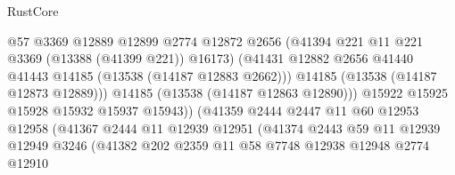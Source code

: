 \begin{lexlean}{RustCore}
\begin{coremodule}
                                          @57
                                          @3369
                                          @12889
                                          @12899
                                          @2774
                                          @12872
                                          @2656
                                          (@41394 @221 @11 @221 @3369 (@13388 (@41399 @221)) @16173)
                                          (@41431
                                            @12882
                                            @2656
                                            @41440
                                            @41443
                                            @14185
                                            (@13538 (@14187 @12883 @2662)))
                                          @14185
                                          (@13538 (@14187 @12873 @12889)))
                                        @14185
                                        (@13538 (@14187 @12863 @12890)))
                                      @15922
                                      @15925
                                      @15928
                                      @15932
                                      @15937
                                      @15943))
                                  (@41359
                                    @2444
                                    @2447
                                    @11
                                    @60
                                    @12953
                                    @12958
                                    (@41367
                                      @2444
                                      @11
                                      @12939
                                      @12951
                                      (@41374
                                        @2443
                                        @59
                                        @11
                                        @12939
                                        @12949
                                        @3246
                                        (@41382
                                          @202
                                          @2359
                                          @11
                                          @58
                                          @7748
                                          @12938
                                          @12948
                                          @2774
                                          @12910

\end{coremodule}
\end{lexlean}
